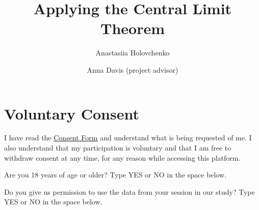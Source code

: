\documentclass{ximera}
\author{Anastasiia Holovchenko \and Anna Davis (project advisor)} \title{Applying the Central Limit Theorem}
\begin{document}
\begin{abstract}
\end{abstract}
\maketitle


\section{Voluntary Consent} 
I have read the \href{https://ximera.osu.edu/statproj/CLTtoHT/consent/main}{Consent Form} and understand what is being requested of me.  I also understand that my participation is voluntary and that I am free to withdraw consent at any time, for any reason while accessing this platform.

 \begin{question} 
Are you 18 years of age or older? Type YES or NO in the space below.  
\begin{freeResponse}  
\end{freeResponse}  
\end{question}

\begin{question}  
Do you give us permission to use the data from your session in our study?  Type YES or NO in the space below. 
\begin{freeResponse}  
\end{freeResponse}  
\end{question}
\end{document}
